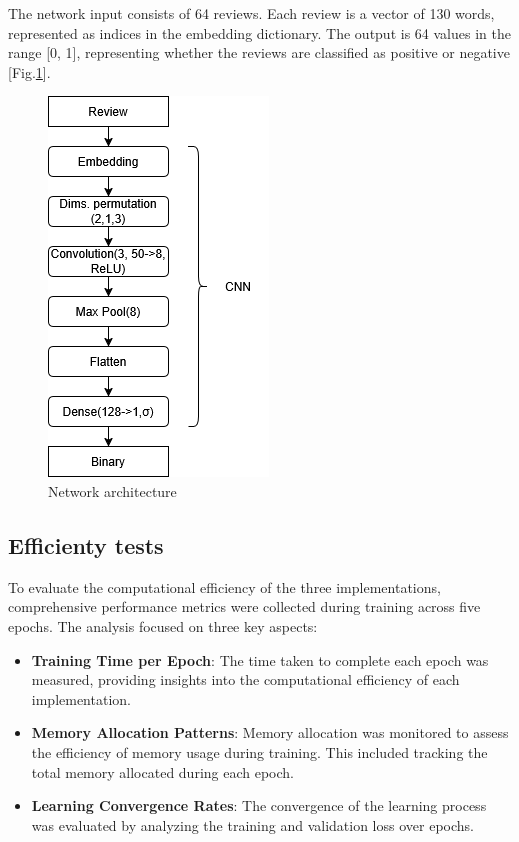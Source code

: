 \documentclass[conference]{IEEEtran}
\begin{document}
The network input consists of 64 reviews. Each review is a vector of 130 words, represented as indices in the embedding dictionary. The output is 64 values in the range [0, 1], representing whether the reviews are classified as positive or negative [Fig.\ref{fig:Network_architecture}].

\begin{figure}
    \centering
    \includegraphics[height=0.9\linewidth]{Network.png}
    \caption{Network architecture}
    \label{fig:Network_architecture}
\end{figure}

\subsection{Efficienty tests}
To evaluate the computational efficiency of the three implementations, 
comprehensive performance metrics were collected during training across five epochs. 
The analysis focused on three key aspects:
\begin{itemize}
    \item \textbf{Training Time per Epoch}: The time taken to complete each epoch was 
    measured, providing insights into the computational efficiency of 
    each implementation.
    \item \textbf{Memory Allocation Patterns}: Memory allocation was monitored to assess the efficiency 
    of memory usage during training. This included tracking the total memory allocated during each epoch.
    \item \textbf{Learning Convergence Rates}: The convergence of the learning process was evaluated 
    by analyzing the training and validation loss over epochs.
\end{itemize}
\end{document}
